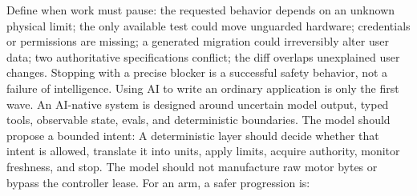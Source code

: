 \markdownRendererInterblockSeparator
{}Define when work must pause:\markdownRendererInterblockSeparator
{}\markdownRendererUlBegin
\markdownRendererUlItem the requested behavior depends on an unknown physical limit;\markdownRendererUlItemEnd 
\markdownRendererUlItem the only available test could move unguarded hardware;\markdownRendererUlItemEnd 
\markdownRendererUlItem credentials or permissions are missing;\markdownRendererUlItemEnd 
\markdownRendererUlItem a generated migration could irreversibly alter user data;\markdownRendererUlItemEnd 
\markdownRendererUlItem two authoritative specifications conflict;\markdownRendererUlItemEnd 
\markdownRendererUlItem the diff overlaps unexplained user changes.\markdownRendererUlItemEnd 
\markdownRendererUlEnd \markdownRendererInterblockSeparator
{}Stopping with a precise blocker is a successful safety behavior, not a failure\markdownRendererSoftLineBreak
{}of intelligence.\markdownRendererInterblockSeparator
{}\markdownRendererThematicBreak{}\markdownRendererInterblockSeparator
{}
\markdownRendererSectionEnd 
\markdownRendererSectionEnd \markdownRendererSectionBegin
{}\markdownRendererInterblockSeparator
{}Using AI to write an ordinary application is only the first wave. An AI-native\markdownRendererSoftLineBreak
{}system is designed around uncertain model output, typed tools, observable\markdownRendererSoftLineBreak
{}state, evals, and deterministic boundaries.\markdownRendererInterblockSeparator
{}\markdownRendererSectionBegin
{}\markdownRendererInterblockSeparator
{}The model should propose a bounded intent:\markdownRendererInterblockSeparator
{}\markdownRendererInterblockSeparator
{}A deterministic layer should decide whether that intent is allowed, translate\markdownRendererSoftLineBreak
{}it into units, apply limits, acquire authority, monitor freshness, and stop.\markdownRendererSoftLineBreak
{}The model should not manufacture raw motor bytes or bypass the controller\markdownRendererSoftLineBreak
{}lease.\markdownRendererParagraphSeparator
{}For an arm, a safer progression is:\markdownRendererInterblockSeparator
{}\markdownRendererInterblockSeparator
